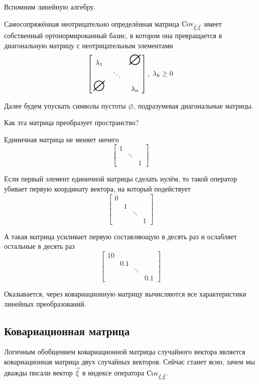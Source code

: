 \begin{remark}\label{remark:linearAlgebra:selfAdjointMatrix}
    Вспомним линейную алгебру.

    Самосопряжённая неотрицательно определённая матрица $\operatorname{Cov^{}_{\vec{\xi}, \vec{\xi}}}$ имеет
    собственный ортонормированный базис, в котором она превращается в
    диагональную матрицу с неотрицательным элементами
    $$\begin{bmatrix}
        \lambda_1 & & \mbox{\Huge{$\varnothing$}} \\
         & \ddots &  \\
         \mbox{\Huge{$\varnothing$}} & & \lambda_n
    \end{bmatrix},\; \lambda_k \ge 0$$

    Далее будем упускать символы пустоты $\varnothing$,
    подразумевая диагональные матрицы.

    Как эта матрица преобразует пространство?

    Единичная матрица не меняет ничего
    $$\begin{bmatrix}
        1 & &\\
        & \ddots & \\
        & & 1
    \end{bmatrix}$$

    Если первый элемент единичной матрицы сделать нулём, то такой оператор
    убивает первую координату вектора, на который подействует
    $$\begin{bmatrix}
        0 & & & \\
        & 1 & & \\
        & & \ddots & \\
        & & & 1
    \end{bmatrix}$$

    А такая матрица усиливает первую составляющую в десять раз и
    ослабляет остальные в десять раз
    $$\begin{bmatrix}
        10 & & &\\
        & 0.1 & & \\
        & & \ddots & \\
        & & & 0.1
    \end{bmatrix}$$

    Оказывается, через ковариационную матрицу вычисляются все характеристики
    линейных преобразований.
\end{remark}

\subsection{Ковариационная матрица}
\label{section:covMatrix}
Логичным обобщением ковариационной матрицы случайного вектора является
ковариационная матрица двух случайных векторов. Сейчас станет ясно, зачем мы
дважды писали вектор $\vec{\xi}$ в индексе оператора $\operatorname{Cov^{}_{\vec{\xi}, \vec{\xi}}}$.

